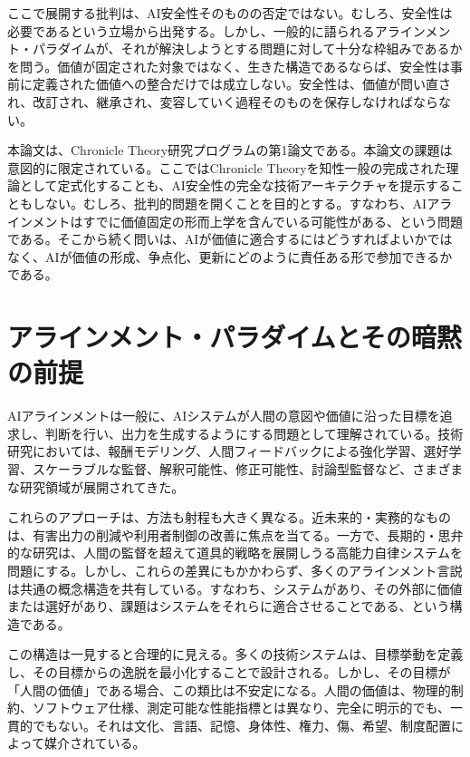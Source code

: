 \documentclass[11pt,a4paper]{ltjsarticle}
\begin{document}
ここで展開する批判は、AI安全性そのものの否定ではない。むしろ、安全性は必要であるという立場から出発する。しかし、一般的に語られるアラインメント・パラダイムが、それが解決しようとする問題に対して十分な枠組みであるかを問う。価値が固定された対象ではなく、生きた構造であるならば、安全性は事前に定義された価値への整合だけでは成立しない。安全性は、価値が問い直され、改訂され、継承され、変容していく過程そのものを保存しなければならない。

本論文は、Chronicle Theory研究プログラムの第1論文である。本論文の課題は意図的に限定されている。ここではChronicle Theoryを知性一般の完成された理論として定式化することも、AI安全性の完全な技術アーキテクチャを提示することもしない。むしろ、批判的問題を開くことを目的とする。すなわち、AIアラインメントはすでに価値固定の形而上学を含んでいる可能性がある、という問題である。そこから続く問いは、AIが価値に適合するにはどうすればよいかではなく、AIが価値の形成、争点化、更新にどのように責任ある形で参加できるかである。

\section{アラインメント・パラダイムとその暗黙の前提}

AIアラインメントは一般に、AIシステムが人間の意図や価値に沿った目標を追求し、判断を行い、出力を生成するようにする問題として理解されている\parencite{christiano2018clarifying,gabriel2020alignment,russell2019human}。技術研究においては、報酬モデリング、人間フィードバックによる強化学習、選好学習、スケーラブルな監督、解釈可能性、修正可能性、討論型監督など、さまざまな研究領域が展開されてきた\parencite{hadfield2016cirl,irving2018debate,ngo2024alignment}。

これらのアプローチは、方法も射程も大きく異なる。近未来的・実務的なものは、有害出力の削減や利用者制御の改善に焦点を当てる。一方で、長期的・思弁的な研究は、人間の監督を超えて道具的戦略を展開しうる高能力自律システムを問題にする\parencite{bostrom2014superintelligence}。しかし、これらの差異にもかかわらず、多くのアラインメント言説は共通の概念構造を共有している。すなわち、システムがあり、その外部に価値または選好があり、課題はシステムをそれらに適合させることである、という構造である。

この構造は一見すると合理的に見える。多くの技術システムは、目標挙動を定義し、その目標からの逸脱を最小化することで設計される。しかし、その目標が「人間の価値」である場合、この類比は不安定になる。人間の価値は、物理的制約、ソフトウェア仕様、測定可能な性能指標とは異なり、完全に明示的でも、一貫的でもない。それは文化、言語、記憶、身体性、権力、傷、希望、制度配置によって媒介されている。
\end{document}
